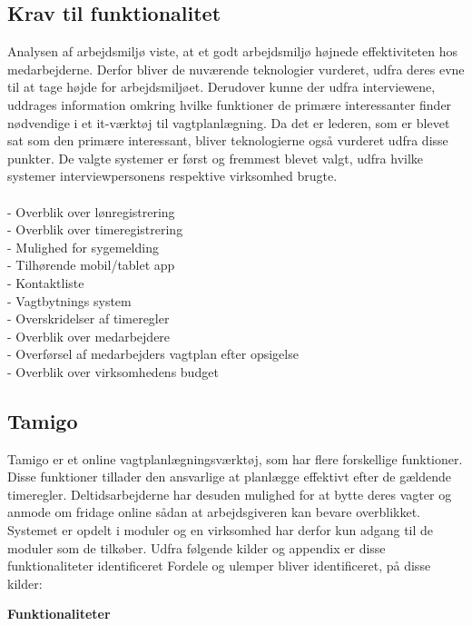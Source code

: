 \subsection{Krav til funktionalitet}
Analysen af arbejdsmiljø viste, at et godt arbejdsmiljø højnede effektiviteten hos medarbejderne. Derfor bliver de nuværende teknologier vurderet, udfra deres evne til at tage højde for arbejdsmiljøet. Derudover kunne der udfra interviewene, uddrages information omkring hvilke funktioner de primære interessanter finder nødvendige i et it-værktøj til vagtplanlægning. Da det er lederen, som er blevet sat som den primære interessant, bliver teknologierne også vurderet udfra disse punkter. De valgte systemer er først og fremmest blevet valgt, udfra hvilke systemer interviewpersonens respektive virksomhed brugte. 
\\\\
- Overblik over lønregistrering\\
- Overblik over timeregistrering\\
- Mulighed for sygemelding\\
- Tilhørende mobil/tablet app\\
- Kontaktliste\\
- Vagtbytnings system\\
- Overskridelser af timeregler\\
- Overblik over medarbejdere\\
- Overførsel af medarbejders vagtplan efter opsigelse\\
- Overblik over virksomhedens budget\\

\subsection{Tamigo}
Tamigo er et online vagtplanlægningsværktøj, som har flere forskellige funktioner. Disse funktioner tillader den ansvarlige at planlægge effektivt efter de gældende timeregler. Deltidsarbejderne har desuden mulighed for at bytte deres vagter og anmode om fridage online sådan at arbejdsgiveren kan bevare overblikket. Systemet er opdelt i moduler og en virksomhed har derfor kun adgang til de moduler som de tilkøber. Udfra følgende kilder og appendix er disse funktionaliteter identificeret \citep{Tamigo, Trustpilot}  Fordele og ulemper bliver identificeret, på disse kilder:

\textbf{Funktionaliteter}

